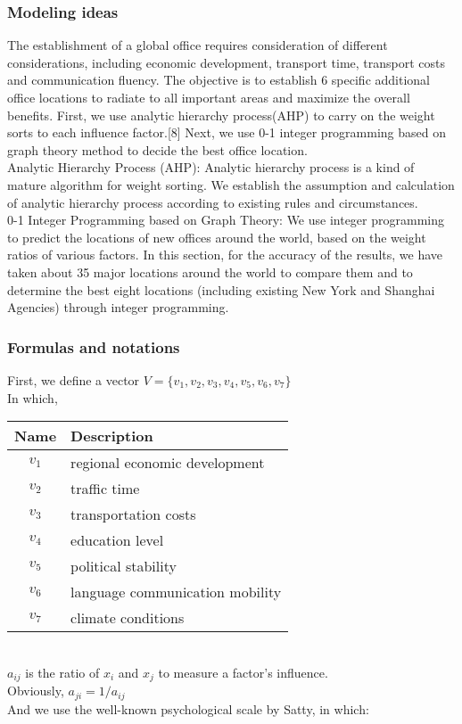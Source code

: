 \documentclass{mcmthesis}
\begin{document}
\subsubsection{Modeling ideas}
\hspace*{8mm}The establishment of a global office requires consideration of different considerations, including economic development, transport time, transport costs and communication fluency. The objective is to establish 6 specific additional office locations to radiate to all important areas and maximize the overall benefits. First, we use analytic hierarchy process(AHP) to carry on the weight sorts to each influence factor.[8] Next, we use 0-1 integer programming based on graph theory method to decide the best office location.\\
\hspace*{8mm}Analytic Hierarchy Process (AHP): Analytic hierarchy process is a kind of mature algorithm for weight sorting. We establish the assumption and calculation of analytic hierarchy process according to existing rules and circumstances.\\
\hspace*{8mm}0-1 Integer Programming based on Graph Theory: We use integer programming to predict the locations of new offices around the world, based on the weight ratios of various factors. In this section, for the accuracy of the results, we have taken about 35 major locations around the world to compare them and to determine the best eight locations (including existing New York and Shanghai Agencies) through integer programming.

\subsubsection{Formulas and notations}
First, we define a vector $V=\{v_1,v_2,v_3,v_4,v_5,v_6,v_7\}$ \\
In which,\\

\begin{tabular}{c|l}
Name & Description \\
\hline $v_1$ & regional economic development \\
$v_2$ & traffic time \\
$v_3$ & transportation costs \\
$v_4$ & education level \\
$v_5$ & political stability \\
$v_6$ & language communication mobility \\
$v_7$ & climate conditions \\
\end{tabular} \\
$a_{ij}$ is the ratio of $x_i$ and $x_j$ to measure a factor's influence.\\
Obviously, $a_{ji}={1}/{a_{ij}}$ \\
And we use the well-known psychological scale by Satty, in which: \\
\end{document}
